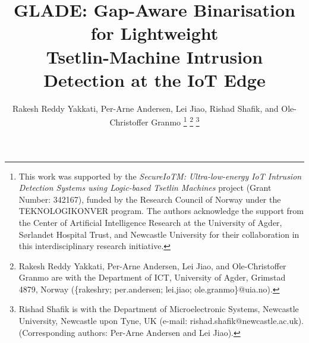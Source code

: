\documentclass[journal,twoside,web]{ieeecolor}
\begin{document}
\title{GLADE: Gap-Aware Binarisation for Lightweight\\ Tsetlin-Machine Intrusion Detection at the IoT Edge}
\author{Rakesh Reddy Yakkati, Per-Arne Andersen, Lei Jiao, Rishad Shafik, and Ole-Christoffer Granmo
\thanks{This work was supported by the \textit{SecureIoTM: Ultra-low-energy IoT Intrusion Detection Systems using Logic-based Tsetlin Machines} project (Grant Number: 342167), funded by the Research Council of Norway under the TEKNOLOGIKONVER program. 
The authors acknowledge the support from the Center of Artificial Intelligence Research at the University of Agder, Sørlandet Hospital Trust, and Newcastle University for their collaboration in this interdisciplinary research initiative.}%
\thanks{Rakesh Reddy Yakkati, Per-Arne Andersen, Lei Jiao, and Ole-Christoffer Granmo are with the Department of ICT, 
University of Agder, Grimstad 4879, Norway (\{rakeshry; per.andersen; lei.jiao; ole.granmo\}@uia.no). }
\thanks{Rishad Shafik is with the Department of Microelectronic Systems, Newcastle University, Newcastle upon Tyne, UK (e-mail: rishad.shafik@newcastle.ac.uk). (Corresponding authors: Per-Arne Andersen and Lei Jiao).}}

\maketitle
\end{document}
